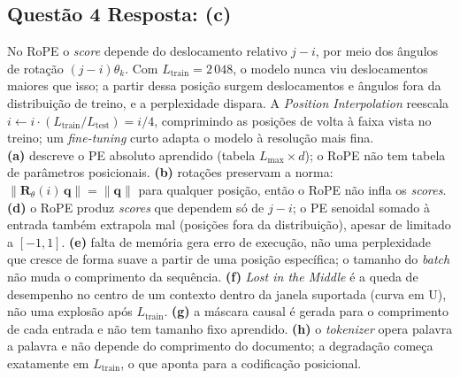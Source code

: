 \documentclass[11pt,a4paper]{article}
\begin{document}
\subsection*{Questão 4 \textemdash{} Resposta: (c)}
No RoPE o \textit{score} depende do deslocamento relativo $j - i$, por meio dos ângulos de rotação $(j - i)\theta_k$. Com $L_\text{train} = 2\,048$, o modelo nunca viu deslocamentos maiores que isso; a partir dessa posição surgem deslocamentos e ângulos fora da distribuição de treino, e a perplexidade dispara. A \textit{Position Interpolation} reescala $i \leftarrow i \cdot (L_\text{train}/L_\text{test}) = i/4$, comprimindo as posições de volta à faixa vista no treino; um \textit{fine-tuning} curto adapta o modelo à resolução mais fina.\\
\textbf{(a)} descreve o PE absoluto aprendido (tabela $L_{\max} \times d$); o RoPE não tem tabela de parâmetros posicionais.
\textbf{(b)} rotações preservam a norma: $\|\mathbf{R}_\theta(i)\,\mathbf{q}\| = \|\mathbf{q}\|$ para qualquer posição, então o RoPE não infla os \textit{scores}.
\textbf{(d)} o RoPE produz \textit{scores} que dependem só de $j - i$; o PE senoidal somado à entrada também extrapola mal (posições fora da distribuição), apesar de limitado a $[-1, 1]$.
\textbf{(e)} falta de memória gera erro de execução, não uma perplexidade que cresce de forma suave a partir de uma posição específica; o tamanho do \textit{batch} não muda o comprimento da sequência.
\textbf{(f)} \textit{Lost in the Middle} é a queda de desempenho no centro de um contexto dentro da janela suportada (curva em U), não uma explosão após $L_\text{train}$.
\textbf{(g)} a máscara causal é gerada para o comprimento de cada entrada e não tem tamanho fixo aprendido.
\textbf{(h)} o \textit{tokenizer} opera palavra a palavra e não depende do comprimento do documento; a degradação começa exatamente em $L_\text{train}$, o que aponta para a codificação posicional.
\end{document}
